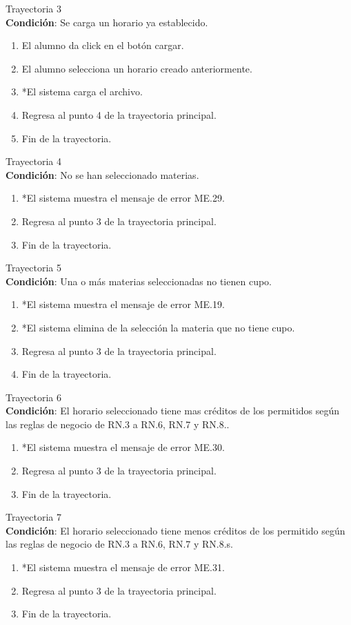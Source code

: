 \large{Trayectoria 3}\\
\textbf{Condición}: Se carga un horario ya establecido.
\begin{enumerate}
    \item El alumno da click en el botón cargar.
    \item El alumno selecciona un horario creado anteriormente.
    \item *El sistema carga el archivo.
    \item Regresa al punto 4 de la trayectoria principal.
    \item Fin de la trayectoria.
\end{enumerate}
\large{Trayectoria 4}\\
\textbf{Condición}: No se han seleccionado materias.
\begin{enumerate}
    \item *El sistema muestra el mensaje de error ME.29.
    \item Regresa al punto 3 de la trayectoria principal.
    \item Fin de la trayectoria.
\end{enumerate}
\large{Trayectoria 5}\\
\textbf{Condición}: Una o más materias seleccionadas no tienen cupo.
\begin{enumerate}
    \item *El sistema muestra el mensaje de error ME.19.
    \item *El sistema elimina de la selección la materia que no tiene cupo.
    \item Regresa al punto 3 de la trayectoria principal.
    \item Fin de la trayectoria.
\end{enumerate}
\large{Trayectoria 6}\\
\textbf{Condición}: El horario seleccionado tiene mas créditos de los permitidos según las reglas de negocio de RN.3 a RN.6, RN.7 y RN.8..
\begin{enumerate}
    \item *El sistema muestra el mensaje de error ME.30.
    \item Regresa al punto 3 de la trayectoria principal.
    \item Fin de la trayectoria.
\end{enumerate}
\large{Trayectoria 7}\\
\textbf{Condición}: El horario seleccionado tiene menos créditos de los permitido según las reglas de negocio de RN.3 a RN.6, RN.7 y RN.8.s.
\begin{enumerate}
    \item *El sistema muestra el mensaje de error ME.31.
    \item Regresa al punto 3 de la trayectoria principal.
    \item Fin de la trayectoria.
\end{enumerate}
